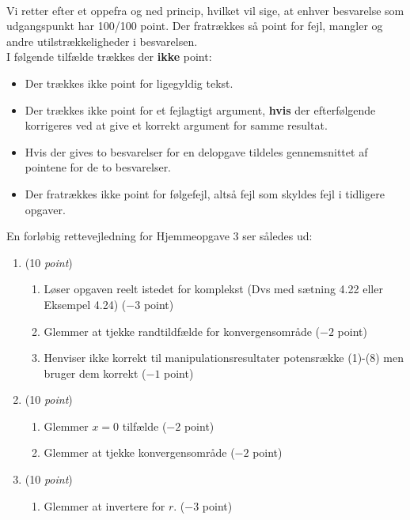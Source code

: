 \documentclass{article}
\begin{document}
\vspace*{0.2cm}\\
Vi retter efter et oppefra og ned princip, hvilket vil sige, at enhver besvarelse som udgangspunkt har 100/100 point. Der fratrækkes så point for fejl, mangler og andre utilstrækkeligheder i besvarelsen.
\vspace*{0.2cm}\\
I følgende tilfælde trækkes der \textbf{ikke} point:
\begin{itemize}
	\item Der trækkes ikke point for ligegyldig tekst.
	\item Der trækkes ikke point for et fejlagtigt argument, \textbf{hvis} der efterfølgende korrigeres ved at give et korrekt argument for samme resultat. 
	\item Hvis der gives to besvarelser for en delopgave tildeles gennemsnittet af pointene for de to besvarelser.
	\item Der fratrækkes ikke point for følgefejl, altså fejl som skyldes fejl i tidligere opgaver.
\end{itemize}

En forløbig rettevejledning for Hjemmeopgave 3 ser således ud:

\begin{opg}\hfill
	\begin{enumerate}
		\item (10 \emph{point})\begin{enumerate}[label=(\roman*)]
			\item Løser opgaven reelt istedet for komplekst (Dvs med sætning 4.22 eller Eksempel 4.24) ($ -3 $ point)
			\item Glemmer at tjekke randtildfælde for konvergensområde ($ -2 $ point)
			\item Henviser ikke korrekt til manipulationsresultater potensrække (1)-(8) men bruger dem korrekt ($ -1 $ point)
		\end{enumerate}
		\item (10 \emph{point}) \begin{enumerate}[label=(\roman*)]
			\item Glemmer $ x=0 $ tilfælde ($ -2 $ point)
			\item Glemmer at tjekke konvergensområde ($ -2 $ point)
		\end{enumerate}
		\item (10 \emph{point})\begin{enumerate}[label=(\roman*)]
			\item Glemmer at invertere for $ r $. ($ -3 $ point)
		\end{enumerate}
	\end{enumerate}	
\end{opg}
\end{document}
